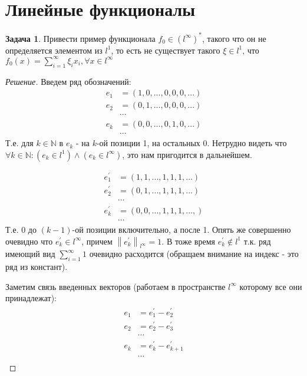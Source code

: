 \documentclass[12pt,a4paper]{article}
\theoremstyle{definition}
\newtheorem{exercise}{Задача}[section]
\newenvironment{solution}
{\renewcommand\qedsymbol{$\blacksquare$}\begin{proof}[Решение]}
{\end{proof}}
\newcommand{\Natural}{\mathbb{N}}
\newcommand{\norm}[1]{\left\lVert#1\right\rVert}
\newcommand{\conj}[1]{\left(#1\right)^*}
\begin{document}
	\section{Линейные функционалы}
	
	\begin{exercise}
		Привести пример функционала $f_0 \in \conj{l^\infty}$, такого что он не определяется элементом из $l^1$, то есть не существует такого $\xi \in l^1$, что \\ $f_0 (x) = \sum\limits_{i=1}^{\infty}{\xi_i x_i}, \forall x \in l^{\infty}$
	\end{exercise}
	\begin{solution} Введем ряд обозначений:
		\begin{align*}
			e_1 &= (1, 0, ..., 0, 0, 0, ...) 	\\
			e_2 &= (0, 1, ..., 0, 0, 0, ...) 	\\
				&\cdots						\\
			e_k &= (0, 0, ..., 0, 1, 0, ...)	\\
				&\cdots 
		\end{align*}
		Т.е. для $k \in \Natural$ в $e_k$ - на $k$-ой позиции 1, на остальных 0. Нетрудно видеть что $\forall k \in \Natural: (e_k \in l^1) \wedge (e_k \in l^\infty)$, это нам пригодится в дальнейшем.
		
		\begin{align*}
			e_1^\prime 	&= \left(1, 1, ..., 1, 1, 1, ...\right) \\
			e_2^\prime 	&= \left(0, 1, ..., 1, 1, 1, ...\right) 			\\
						&\cdots 				\\
			e_k^\prime 	&= \left(0, 0, ..., 1, 1, 1, ...,\right) \\
						&\cdots 
		\end{align*}
		Т.е. 0 до $(k-1)$-ой позиции включительно, а после 1. Опять же совершенно очевидно что $e_k^\prime \in l^\infty$, причем $\norm{e_k^\prime}_{l^\infty} = 1$. В тоже время $e_k^\prime \notin l^1$ т.к. ряд имеющий вид $\sum\limits_{i=1}^\infty{1}$ очевидно расходится (обращаем внимание на индекс - это ряд из констант).
		
		Заметим связь введенных векторов (работаем в пространстве $l^\infty$ которому все они принадлежат):
		\begin{align}\label{eq:2}
		\begin{split}
			e_1 &= e_1^\prime - e_2^\prime \\
			e_2 &= e_2^\prime - e_3^\prime \\
					   &\cdots \\
			e_k &= e_{k}^\prime - e_{k+1}^\prime \\
					   &\cdots
		\end{split}
		\end{align}
		

\end{solution}
\end{document}

